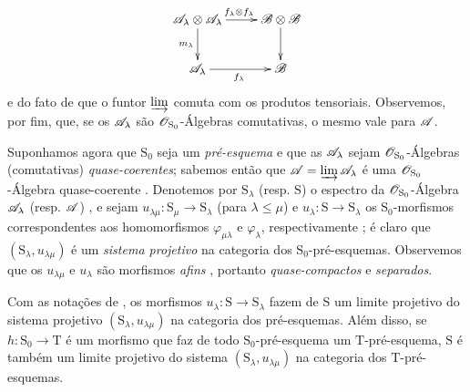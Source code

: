 \begin{env}[8.2.1]
\[
\xymatrix{
  \sh{A}_\lambda\otimes\sh{A}_\lambda \ar[r]^{f_\lambda\otimes f_\lambda} \ar[d]_{m_\lambda} & \sh{B}\otimes\sh{B} \ar[d] \\
  \sh{A}_\lambda \ar[r]_{f_\lambda} & \sh{B}
}
\]
e do fato de que o funtor $\varinjlim$ comuta com os produtos tensoriais.
Observemos, por fim, que, se os $\mathscr{A}_\lambda$ são $\mathscr{O}_{\mathrm{S}_0}$-Álgebras comutativas, o mesmo vale para $\mathscr{A}$.
\end{env}

\begin{env}[8.2.2]
\label{IV.8.2.2}
Suponhamos agora que $\mathrm{S}_0$ seja um \emph{pré-esquema} e que as $\mathscr{A}_\lambda$ sejam $\mathscr{O}_{\mathrm{S}_0}$-Álgebras (comutativas) \emph{quase-coerentes}; sabemos então que $\mathscr{A}=\varinjlim\mathscr{A}_\lambda$ é uma $\mathscr{O}_{\mathrm{S}_0}$-Álgebra quase-coerente .
Denotemos por $\mathrm{S}_\lambda$ (resp. $\mathrm{S}$) o espectro da $\mathscr{O}_{\mathrm{S}_0}$-Álgebra $\mathscr{A}_\lambda$ (resp. $\mathscr{A}$) , e sejam $u_{\lambda\mu}:\mathrm{S}_\mu\to\mathrm{S}_\lambda$ (para $\lambda\leqslant\mu$) e $u_\lambda:\mathrm{S}\to\mathrm{S}_\lambda$ os $\mathrm{S}_0$-morfismos correspondentes aos homomorfismos $\varphi_{\mu\lambda}$ e $\varphi_\lambda$, respectivamente ; é claro que $(\mathrm{S}_\lambda,u_{\lambda\mu})$ é um \emph{sistema projetivo} na categoria dos $\mathrm{S}_0$-pré-esquemas.
Observemos que os $u_{\lambda\mu}$ e $u_\lambda$ são morfismos \emph{afins} , portanto \emph{quase-compactos} e \emph{separados}.
\end{env}

\begin{proposition}[8.2.3]
\label{IV.8.2.3}
Com as notações de , os morfismos $u_\lambda:\mathrm{S}\to\mathrm{S}_\lambda$ fazem de $\mathrm{S}$ um limite projetivo do sistema projetivo $(\mathrm{S}_\lambda,u_{\lambda\mu})$ na categoria dos pré-esquemas.
Além disso, se $h:\mathrm{S}_0\to\mathrm{T}$ é um morfismo que faz de todo $\mathrm{S}_0$-pré-esquema um $\mathrm{T}$-pré-esquema, $\mathrm{S}$ é também um limite projetivo do sistema $(\mathrm{S}_\lambda,u_{\lambda\mu})$ na categoria dos $\mathrm{T}$-pré-esquemas.
\end{proposition}

